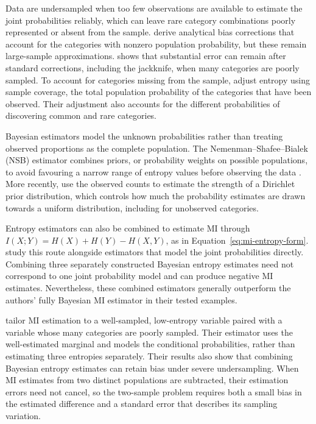 Data are undersampled when too few observations are available to estimate
the joint probabilities reliably, which can leave rare category combinations
poorly represented or absent from the sample. \citet{panzeri1996} derive
analytical bias corrections that account
for the categories with nonzero population probability, but these remain
large-sample approximations. \citet{paninski2003} shows that substantial
error can remain after standard corrections, including the jackknife,
when many categories are poorly sampled. To account for categories missing
from the sample, \citet{chaoshen2003} adjust entropy using sample coverage,
the total population probability of the categories that have been observed.
Their adjustment also accounts for the different probabilities of
discovering common and rare categories.

Bayesian estimators model the unknown probabilities rather than treating
observed proportions as the complete population.
The Nemenman--Shafee--Bialek (NSB) estimator combines priors, or probability
weights on possible populations, to avoid favouring a narrow range of
entropy values before observing the data \citep{nemenman2002}.
More recently, \citet{piga2024} use the observed counts to estimate the
strength of a Dirichlet prior distribution, which controls how much the
probability estimates are drawn towards a uniform distribution, including for
unobserved categories.

Entropy estimators can also be combined to estimate MI through
\(I(X;Y)=H(X)+H(Y)-H(X,Y)\), as in
Equation~\eqref{eq:mi-entropy-form}. \citet{archer2013} study this route
alongside estimators that model the joint probabilities directly. Combining
three separately constructed Bayesian entropy estimates need not correspond
to one joint probability model and can produce negative MI estimates.
Nevertheless, these combined estimators generally outperform the authors'
fully Bayesian MI estimator in their tested examples.

\citet{hernandez2019} tailor MI estimation to a well-sampled, low-entropy
variable paired with a variable whose many categories are poorly sampled.
Their estimator uses the well-estimated marginal and models the conditional
probabilities, rather than estimating three entropies separately. Their results also
show that combining Bayesian entropy estimates can retain bias under severe
undersampling. When MI estimates from two distinct populations are
subtracted, their estimation errors need not cancel, so the two-sample problem
requires both a small bias in the estimated difference and a standard error
that describes its sampling variation.

